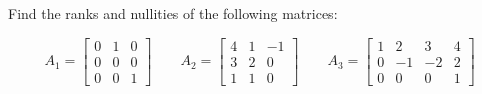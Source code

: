 \item [3.5] Find the ranks and nullities of the following matrices:

\begin{equation*}
 A_1 = \begin{bmatrix}
      0 & 1 & 0\\
      0 & 0 & 0\\
      0 & 0 & 1
     \end{bmatrix}
\qquad
A_2 =  \begin{bmatrix}
      4 & 1 & -1\\
      3 & 2 & 0\\
      1 & 1 & 0
     \end{bmatrix}
\qquad
A_3 = \begin{bmatrix}
      1 & 2 & 3 & 4\\
      0 & -1 & -2 & 2\\
      0 & 0 & 0 & 1
     \end{bmatrix}
\end{equation*}
